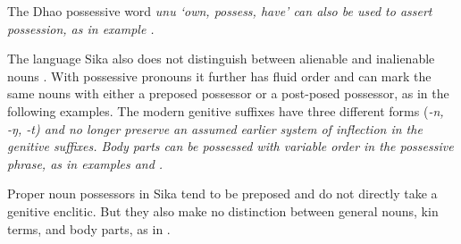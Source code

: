 \begin{exe}
	\label{ex:02-15}
	\label{ex:02-16}
	\label{ex:02-17}
\end{exe}

The Dhao possessive word \it{unu} ‘own,
possess, have’ can also be used to assert possession,
as in example .

\begin{exe}
	\label{ex:02-18}
\end{exe}

The  language Sika also does not distinguish
between alienable and inalienable nouns \citep[607--608]{LewisGrimes1995}.
With possessive pronouns it further has fluid order
and can mark the same nouns with either a preposed possessor
or a post-posed possessor,
as in the following examples.
The modern genitive suffixes have three different forms
(\it{-n, -ŋ, -t}) and no longer preserve an assumed earlier system of
inflection in the genitive suffixes.
Body parts can be possessed with variable order in the possessive
phrase, as in examples  and .

\begin{exe}
	\label{ex:02-19}
	\label{ex:02-20}
\end{exe}

Proper noun possessors in Sika tend to be preposed
and do not directly take a genitive enclitic.
But they also make no distinction between general nouns,
kin terms, and body parts, as in .

